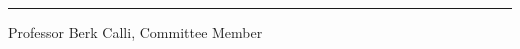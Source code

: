 \documentclass[12pt]{report}
\begin{document}
\vspace{0.5in}
\rule{3in}{0.8pt}

Professor Berk Calli,  Committee Member

\newpage

%
\doublespacing








%



\clearpage



\tableofcontents


\listoffigures

\listoftables


\end{document}
